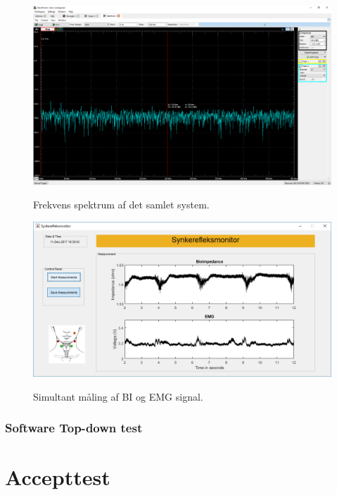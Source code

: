 \begin{figure}[H]
\centering
{\includegraphics[width=\linewidth]
{Figure/integrationstestAAspectrum}}
\caption{Frekvens spektrum af det samlet system. }
\label{fig:integrationstestAAspectrum}
\end{figure} 


\begin{figure}[H]
\centering
{\includegraphics[width=\linewidth]
{Figure/integrationstestSynk1}}
\caption{Simultant måling af BI og EMG signal.}
\label{fig:integrationstestSynk1}
\end{figure} 

















\subsection{Software Top-down test}










\chapter{Accepttest}






\citep{Aroom2009}


